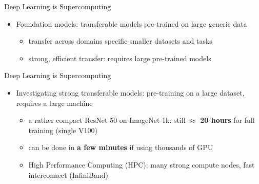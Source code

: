\begin{frame}{Deep Learning is Supercomputing}
\protect\hypertarget{deep-learning-is-supercomputing-10}{}
\begin{itemize}
\tightlist
\item
  Foundation models: transferable models pre-trained on large generic
  data

  \begin{itemize}
  \tightlist
  \item
    transfer across domains specific smaller datasets and tasks
  \item
    strong, efficient transfer: requires large pre-trained models
  \end{itemize}
\end{itemize}

\end{frame}

\begin{frame}{Deep Learning is Supercomputing}
\protect\hypertarget{deep-learning-is-supercomputing-11}{}
\begin{itemize}
\tightlist
\item
  Investigating strong transferable models: pre-training on a large
  dataset, requires a large machine

  \begin{itemize}
  \tightlist
  \item
    a rather compact ResNet-50 on ImageNet-1k: still
    \textbf{\(\boldsymbol{\approx}\) 20 hours} for full training (single
    V100)
  \item
    can be done in \textbf{a few minutes} if using thousands of GPU
  \item
    High Performance Computing (HPC): many strong compute nodes, fast
    interconnect (InfiniBand)
  \end{itemize}
\end{itemize}

\end{frame}

